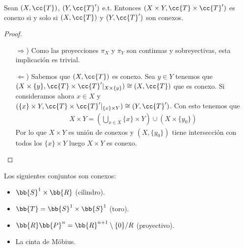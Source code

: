 \begin{prop}
    Sean $(X, \cc{T})$, $(Y, \cc{T}')$ e.t. Entonces $(X\times Y, \cc{T}\times \cc{T}')$ es conexo si y solo si $(X, \cc{T})$ y $(Y, \cc{T}')$ son conexos.
    \begin{proof}\
        \begin{itemize}
            \item[$\Rightarrow$)] Como las proyecciones $\pi_X$ y $\pi_Y$ son continuas y sobreyectivas, esta implicación es trivial.
            \item[$\Leftarrow$)] Sabemos que $(X, \cc{T})$ es conexo. Sea $y\in Y$ tenemos que $(X\times \{y\}, \cc{T}\times \cc{T}'|_{X\times\{y\}})\cong (X, \cc{T})$ que es conexo. Si consideramos ahora $x\in X$ y  $(\{x\}\times Y, \cc{T}\times \cc{T}'|_{\{x\}\times Y})\cong (Y, \cc{T}')$. Con esto tenemos que
            \begin{align*}
                X\times Y = \left(\bigcup\limits_{x\in X}\{x\}\times Y\right) \cup \left(X \times \{y_0\}\right)
            \end{align*}
            Por lo que $X\times Y$ es unión de conexos y $(X, \{y_0\})$ tiene intersección con todos los $\{x\}\times Y$ luego $X\times Y$ es conexo.

        \end{itemize}
    \end{proof}
\end{prop}

\begin{ejemplo}
    Los siguientes conjuntos son conexos:
    \begin{itemize}
        \item $\bb{S}^1 \times \bb{R}$ (cilindro).
        \item $\bb{T}=\bb{S}^1 \times \bb{S}^1$ (toro).
        \item $\bb{R}\bb{P}^n = \bb{R}^{n+1}\setminus \{0\}/R$ (proyectivo).
        \item La cinta de Möbius.
    \end{itemize}
    \endsquare
\end{ejemplo}

